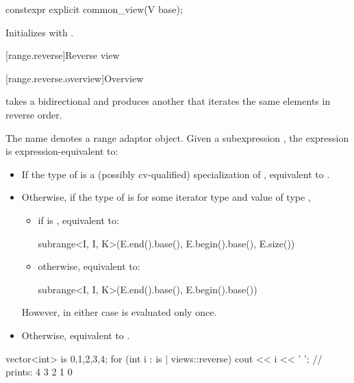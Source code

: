 %
\begin{itemdecl}
constexpr explicit common_view(V base);
\end{itemdecl}

\begin{itemdescr}
\pnum
\effects
Initializes  with .
\end{itemdescr}

[range.reverse]{Reverse view}

[range.reverse.overview]{Overview}

\pnum
{} takes a bidirectional  and produces
another  that iterates the same elements in reverse order.

\pnum
{}%
The name  denotes a
range adaptor object.
Given a subexpression , the expression
 is expression-equivalent to:
\begin{itemize}
\item
  If the type of  is
  a (possibly cv-qualified) specialization of ,
  equivalent to .
\item
  Otherwise, if the type of  is \cv{} 
  for some iterator type  and
  value  of type ,
  \begin{itemize}
  \item
    if  is , equivalent to:
\begin{codeblock}
subrange<I, I, K>(E.end().base(), E.begin().base(), E.size())
\end{codeblock}
  \item
    otherwise, equivalent to:
\begin{codeblock}
subrange<I, I, K>(E.end().base(), E.begin().base())
\end{codeblock}
  \end{itemize}
  However, in either case  is evaluated only once.
\item
  Otherwise, equivalent to .
\end{itemize}

\pnum
\begin{example}
\begin{codeblock}
vector<int> is {0,1,2,3,4};
for (int i : is | views::reverse)
  cout << i << ' '; // prints: 4 3 2 1 0
\end{codeblock}
\end{example}

